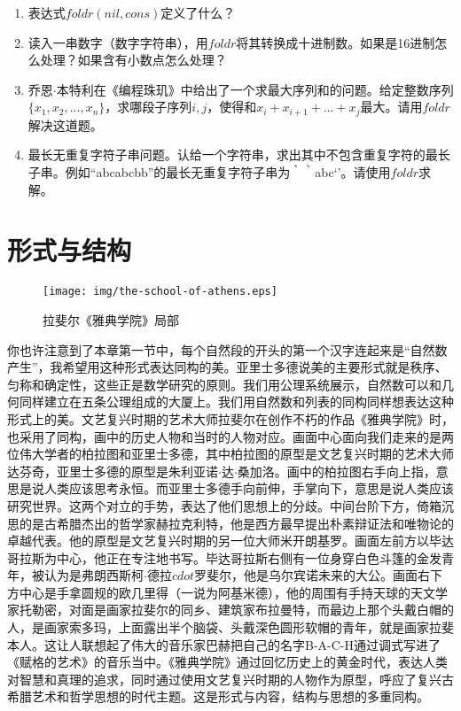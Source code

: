 \documentclass[UTF8]{article}
\begin{document}
\begin{Exercise}
\begin{enumerate}
\item 表达式$foldr(nil, cons)$定义了什么？
\item 读入一串数字（数字字符串），用$foldr$将其转换成十进制数。如果是16进制怎么处理？如果含有小数点怎么处理？
\item 乔恩$\cdot$本特利在《编程珠玑》中给出了一个求最大序列和的问题。给定整数序列$\{x_1, x_2, ..., x_n\}$，求哪段子序列$i, j$，使得和$x_i + x_{i+1} + ... + x_j$最大。请用$foldr$解决这道题。
\item 最长无重复字符子串问题。认给一个字符串，求出其中不包含重复字符的最长子串。例如``abcabcbb''的最长无重复字符子串为｀｀abc‘’。请使用$foldr$求解。
\end{enumerate}
\end{Exercise}

\section{形式与结构}

\begin{figure}[htbp]
 \centering
 \texttt{[image: img/the-school-of-athens.eps]}
 \caption{拉斐尔《雅典学院》局部}
 \label{fig:the-school-of-athens}
\end{figure}

你也许注意到了本章第一节中，每个自然段的开头的第一个汉字连起来是“自然数产生”，我希望用这种形式表达同构的美。亚里士多德说美的主要形式就是秩序、匀称和确定性，这些正是数学研究的原则。我们用公理系统展示，自然数可以和几何同样建立在五条公理组成的大厦上。我们用自然数和列表的同构同样想表达这种形式上的美。文艺复兴时期的艺术大师拉斐尔在创作不朽的作品《雅典学院》时，也采用了同构，画中的历史人物和当时的人物对应。画面中心面向我们走来的是两位伟大学者的柏拉图和亚里士多德，其中柏拉图的原型是文艺复兴时期的艺术大师达芬奇，亚里士多德的原型是朱利亚诺$\cdot$达$\cdot$桑加洛。画中的柏拉图右手向上指，意思是说人类应该思考永恒。而亚里士多德手向前伸，手掌向下，意思是说人类应该研究世界。这两个对立的手势，表达了他们思想上的分歧。中间台阶下方，倚箱沉思的是古希腊杰出的哲学家赫拉克利特，他是西方最早提出朴素辩证法和唯物论的卓越代表。他的原型是文艺复兴时期的另一位大师米开朗基罗。画面左前方以毕达哥拉斯为中心，他正在专注地书写。毕达哥拉斯右侧有一位身穿白色斗篷的金发青年，被认为是弗朗西斯柯$\cdot$德拉$cdot$罗斐尔，他是乌尔宾诺未来的大公。画面右下方中心是手拿圆规的欧几里得（一说为阿基米德），他的周围有手持天球的天文学家托勒密，对面是画家拉斐尔的同乡、建筑家布拉曼特，而最边上那个头戴白帽的人，是画家索多玛，上面露出半个脑袋、头戴深色圆形软帽的青年，就是画家拉斐本人。这让人联想起了伟大的音乐家巴赫把自己的名字B-A-C-H通过调式写进了《赋格的艺术》的音乐当中。《雅典学院》通过回忆历史上的黄金时代，表达人类对智慧和真理的追求，同时通过使用文艺复兴时期的人物作为原型，呼应了复兴古希腊艺术和哲学思想的时代主题。这是形式与内容，结构与思想的多重同构。
\end{document}
